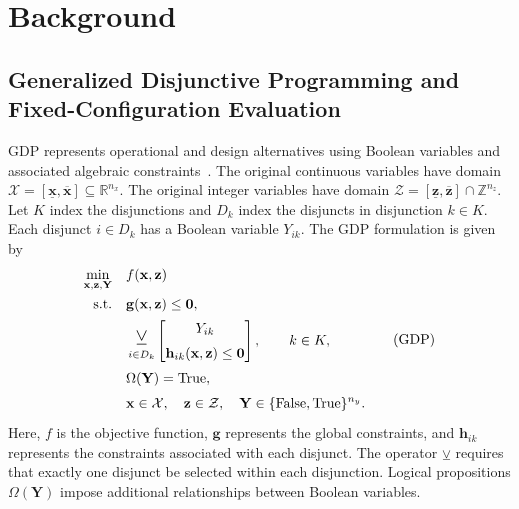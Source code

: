 \documentclass{article}
\newcommand{\bigveebar}{%
  \mathop{\mathlarger{\mathlarger{\veebar}}}\displaylimits%
}
\begin{document}
\section{Background}

\subsection{Generalized Disjunctive Programming and Fixed-Configuration Evaluation}
\label{sec:gdp-background}

GDP represents operational and design alternatives using Boolean variables and associated algebraic constraints~\citep{raman1994modelling}.
The original continuous variables have domain \(\mathcal X=[\underline{\mathbf x},\overline{\mathbf x}]\subseteq\mathbb R^{n_x}\).
The original integer variables have domain \(\mathcal Z=[\underline{\mathbf z},\overline{\mathbf z}]\cap\mathbb Z^{n_z}\).
Let \(K\) index the disjunctions and \(D_k\) index the disjuncts in disjunction \(k\in K\).
Each disjunct \(i\in D_k\) has a Boolean variable \(Y_{ik}\).
The GDP formulation is given by
\begin{equation}\label{eqn:gdp.general}
\begin{aligned}
\min_{\mathbf x,\mathbf z,\mathbf Y}\quad & f(\mathbf x,\mathbf z)\\
\text{s.t.}\quad &\mathbf g(\mathbf x,\mathbf z)\leq\mathbf 0,\\
&\bigveebar_{i\in D_k}\left[
\begin{gathered}
Y_{ik}\\
\mathbf h_{ik}(\mathbf x,\mathbf z)\leq\mathbf 0
\end{gathered}\right],\qquad k\in K,\\
&\Omega(\mathbf Y)=\mathrm{True},\\
&\mathbf x\in\mathcal X,\quad\mathbf z\in\mathcal Z,\quad
\mathbf Y\in\{\mathrm{False},\mathrm{True}\}^{n_y}.
\end{aligned}\tag{GDP}
\end{equation}
Here, \(f\) is the objective function, \(\mathbf g\) represents the global constraints, and \(\mathbf h_{ik}\) represents the constraints associated with each disjunct.
The operator \(\veebar\) requires that exactly one disjunct be selected within each disjunction.
Logical propositions \(\Omega(\mathbf Y)\) impose additional relationships between Boolean variables.
\end{document}
